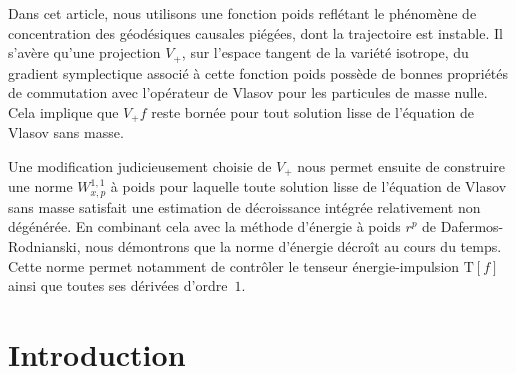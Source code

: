 \documentclass[JEP,XML,SOM,Unicode,published]{cedram}
\theoremstyle{plain}
\theoremstyle{definition}
\begin{document}


\begin{altabstract}
Dans cet article, nous utilisons une fonction poids reflétant le phénomène de concentration des géodésiques causales piégées, dont la trajectoire est instable. Il s'avère qu'une projection $V_+$, sur l'espace tangent de la variété isotrope, du gradient symplectique associé à cette fonction poids possède de bonnes propriétés de commutation avec l'opérateur de Vlasov pour les particules de masse nulle. Cela implique que $V_+f$ reste bornée pour tout solution lisse de l'équation de Vlasov sans masse.

Une modification judicieusement choisie de $V_+$ nous permet ensuite de construire une norme $W^{1,1}_{x,p}$ à poids pour laquelle toute solution lisse de l'équation de Vlasov sans masse satisfait une estimation de décroissance intégrée relativement non dégénérée. En combinant cela avec la méthode d'énergie à poids $r^p$ de Dafermos-Rodnianski, nous démontrons que la norme d'énergie décroît au cours du temps. Cette norme permet notamment de contrôler le tenseur énergie-impulsion $\mathrm{T}[f]$ ainsi que toutes ses dérivées d'ordre~$1$.
\end{altabstract}

\maketitle
\vspace*{-\baselineskip}
\tableofcontents

\mainmatter
\section{Introduction}
\end{document}
